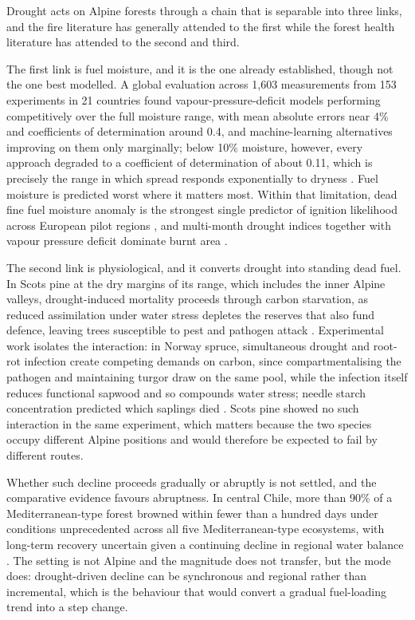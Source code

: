 \documentclass[11pt,a4paper]{article}
\begin{document}
Drought acts on Alpine forests through a chain that is separable into three links, and the fire literature has generally attended to the first while the forest health literature has attended to the second and third.

The first link is fuel moisture, and it is the one already established, though not the one best modelled. A global evaluation across 1{,}603 measurements from 153 experiments in 21 countries found vapour-pressure-deficit models performing competitively over the full moisture range, with mean absolute errors near 4\% and coefficients of determination around 0.4, and machine-learning alternatives improving on them only marginally; below 10\% moisture, however, every approach degraded to a coefficient of determination of about 0.11, which is precisely the range in which spread responds exponentially to dryness \citep{rodrigues_vpdbased_2024}. Fuel moisture is predicted worst where it matters most. Within that limitation, dead fine fuel moisture anomaly is the strongest single predictor of ignition likelihood across European pilot regions \citep{gelabert_assessing_2025}, and multi-month drought indices together with vapour pressure deficit dominate burnt area \citep{miller_compounding_2025, beloiu_climatedriven_2026}.

The second link is physiological, and it converts drought into standing dead fuel. In Scots pine at the dry margins of its range, which includes the inner Alpine valleys, drought-induced mortality proceeds through carbon starvation, as reduced assimilation under water stress depletes the reserves that also fund defence, leaving trees susceptible to pest and pathogen attack \citep{giuggiola_droughtinduced_2010}. Experimental work isolates the interaction: in Norway spruce, simultaneous drought and root-rot infection create competing demands on carbon, since compartmentalising the pathogen and maintaining turgor draw on the same pool, while the infection itself reduces functional sapwood and so compounds water stress; needle starch concentration predicted which saplings died \citep{gomezgallego_interaction_2022}. Scots pine showed no such interaction in the same experiment, which matters because the two species occupy different Alpine positions and would therefore be expected to fail by different routes.

Whether such decline proceeds gradually or abruptly is not settled, and the comparative evidence favours abruptness. In central Chile, more than 90\% of a Mediterranean-type forest browned within fewer than a hundred days under conditions unprecedented across all five Mediterranean-type ecosystems, with long-term recovery uncertain given a continuing decline in regional water balance \citep{miranda_widespread_2023}. The setting is not Alpine and the magnitude does not transfer, but the mode does: drought-driven decline can be synchronous and regional rather than incremental, which is the behaviour that would convert a gradual fuel-loading trend into a step change.
\end{document}
